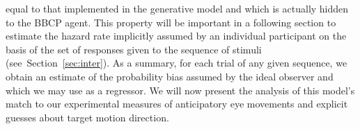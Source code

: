 \documentclass[10pt,letterpaper]{article}
\newcommand{\seeSec}[1]{Section~\ref{sec:#1}}
\begin{document}
equal to that implemented in the generative model and which is actually hidden to the BBCP agent.
This property will be important in a following section
to estimate the hazard rate implicitly assumed by an individual participant
on the basis of the set of responses given to the  sequence of stimuli
(see~\seeSec{inter}).
%
As a summary, for each trial of any given sequence,
we obtain an estimate of the probability bias assumed by the ideal observer
and which we may use as a regressor.
We will now present the analysis of this model's match
to our experimental measures of anticipatory eye movements and
explicit guesses about target motion direction.
\end{document}
